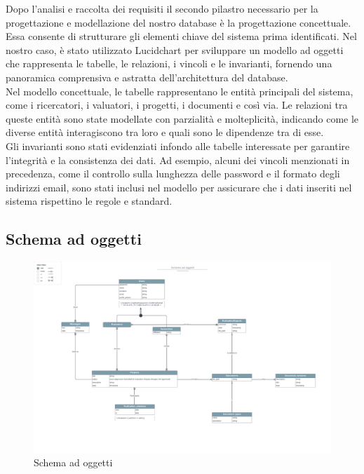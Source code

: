 \documentclass{report}
\begin{document}
Dopo l'analisi e raccolta dei requisiti il secondo pilastro necessario per la progettazione e modellazione del nostro database è la progettazione concettuale. Essa consente di strutturare gli elementi chiave del sistema prima identificati. Nel nostro caso, è stato utilizzato Lucidchart per sviluppare un modello ad oggetti che rappresenta le tabelle, le relazioni, i vincoli e le invarianti, fornendo una panoramica comprensiva e astratta dell'architettura del database.\\
Nel modello concettuale, le tabelle rappresentano le entità principali del sistema, come i ricercatori, i valuatori, i progetti, i documenti e così via. Le relazioni tra queste entità sono state modellate con parzialità e molteplicità, indicando come le diverse entità interagiscono tra loro e quali sono le dipendenze tra di esse.\\
Gli invarianti sono stati evidenziati infondo alle tabelle interessate per garantire l'integrità e la consistenza dei dati. Ad esempio, alcuni dei vincoli menzionati in precedenza, come il controllo sulla lunghezza delle password e il formato degli indirizzi email, sono stati inclusi nel modello per assicurare che i dati inseriti nel sistema rispettino le regole e standard.
\subsection{Schema ad oggetti}
\begin{figure}
\centering
\includegraphics[width=1.00\textwidth]{Schema a oggetti.pdf}
\caption{Schema ad oggetti}
\end{figure}
\newpage
\end{document}
